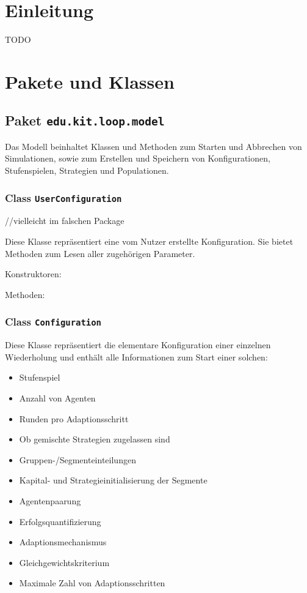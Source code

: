 \documentclass[parskip=full,11pt]{scrartcl}
\begin{document}
\section{Einleitung}
TODO

\section{Pakete und Klassen}
\subsection{Paket \texttt{edu.kit.loop.model}}
Das Modell beinhaltet Klassen und Methoden zum Starten und Abbrechen von Simulationen, sowie zum Erstellen und Speichern von Konfigurationen, Stufenspielen, Strategien und Populationen.

\subsubsection{Class \texttt{UserConfiguration}}
//vielleicht im falschen Package

Diese Klasse repräsentiert eine vom Nutzer erstellte Konfiguration. Sie bietet Methoden zum Lesen aller zugehörigen Parameter.

Konstruktoren:

Methoden:

\subsubsection{Class \texttt{Configuration}}
Diese Klasse repräsentiert die elementare Konfiguration einer einzelnen Wiederholung und enthält alle Informationen zum Start einer solchen:
\begin{itemize}\itemsep -10pt
\item Stufenspiel
\item Anzahl von Agenten
\item Runden pro Adaptionsschritt
\item Ob gemischte Strategien zugelassen sind
\item Gruppen-/Segmenteinteilungen
\item Kapital- und Strategieinitialisierung der Segmente
\item Agentenpaarung
\item Erfolgsquantifizierung
\item Adaptionsmechanismus
\item Gleichgewichtskriterium
\item Maximale Zahl von Adaptionsschritten
\end{itemize}
\end{document}
